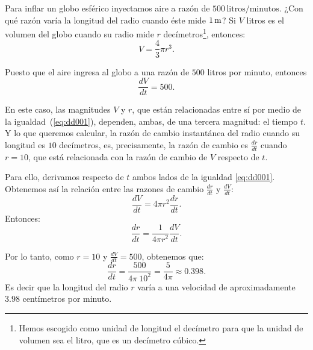 \begin{exemplo}[Solución]{%
Para inflar un globo esférico inyectamos aire a razón de $500\, \text{litros}/\text{minutos}$. ¿Con qué
razón varía la longitud del radio cuando éste mide $1\operatorname{m}$?
}%
Si $V$ litros es el volumen del globo cuando su radio mide $r$ decímetros\footnote{Hemos escogido
como unidad de longitud el decímetro para que la unidad de volumen sea el litro, que es un
decímetro cúbico.}, entonces:
\begin{equation}
\label{eq:dd001}
	V=\frac{4}{3}\pi r^{3}.
\end{equation}

Puesto que el aire ingresa al globo a una razón de $500$ litros por minuto, entonces
\[
\frac{dV}{dt}=500.
\]

En este caso, las magnitudes $V$ y $r$, que están relacionadas entre sí por medio de la
igualdad~(\ref{eq:dd001}), dependen, ambas, de una tercera magnitud: el tiempo $t$. Y lo que
queremos calcular, la razón de cambio instantánea del radio cuando su longitud es $10$ decímetros,
es, precisamente, la razón de cambio es $\frac{dr}{dt}$ cuando $r=10$, que está relacionada con la
razón de cambio de $V$ respecto de $t$.

Para ello, derivamos respecto de $t$ ambos lados de la igualdad \ref{eq:dd001}. Obtenemos así la
relación entre las razones de cambio $\frac{dr}{dt}$ y $\frac{dV}{dt}$:
\begin{equation*}
	\frac{dV}{dt}=4\pi r^{2}\frac{dr}{dt}.
\end{equation*}
Entonces:
\begin{equation*}
	\frac{dr}{dt}=\frac{1}{4\pi r^{2}}\frac{dV}{dt}.
\end{equation*}

Por lo tanto, como $r=10$ y  $\frac{dV}{dt}=500$, obtenemos que:
\begin{equation*}
	\frac{dr}{dt}=\frac{500}{4\pi\  10^{2}}=\frac{5}{4\pi}\approx 0.398.
\end{equation*}
Es decir que la longitud del radio $r$ varía a una velocidad de aproximadamente $3.98$ centímetros
por minuto.
\end{exemplo}

